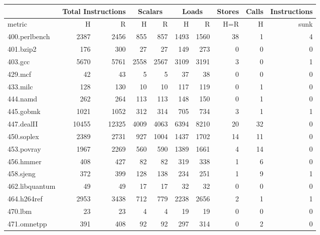 \documentclass[acmlarge,review,anonymous]{acmart}\settopmatter{printfolios=true}
\begin{document}
\begin{table}[h!]
  \begin{center}
    \begin{tabular}{|l|r|r|r|r|r|r|r|r|r|}
      \hline
 \GCM{}  &\multicolumn{2}{|c|}{Total Instructions} &\multicolumn{2}{|c|}{Scalars}  & \multicolumn{2}{|c|}{Loads} & \multicolumn{1}{|c|}{Stores} &Calls   &Instructions    \\\hline
 metric           &  H          &R        &H      &R       &H           &R              &H=R    &H & sunk \\\hline
 400.perlbench	  &  2387	& 2456	  &  855  & 857	   & 1493	& 1560		& 38	& 1	& 4	        \\\hline
 401.bzip2	  &  176	& 300	  &  27	  & 27	   & 149	& 273		& 0	& 0 	& 0		\\\hline
 403.gcc	  &  5670	& 5761	  &  2558 & 2567   & 3109	& 3191		& 3	& 0	& 1	        \\\hline
 429.mcf	  &  42	        & 43	  &  5	  & 5	   & 37 	& 38		& 0	& 0 	& 0		\\\hline
 433.milc	  &  128	& 130	  &  10	  & 10	   & 117	& 119		& 0	& 1	& 0		\\\hline
 444.namd	  &  262	& 264	  &  113  & 113	   & 148	& 150		& 0	& 1	& 0		\\\hline
 445.gobmk	  &  1021	& 1052	  &  312  & 314	   & 705	& 734		& 3	& 1	& 1	        \\\hline
 447.dealII	  &  10455	& 12325	  &  4009 & 4063   & 6394	& 8210		& 20	& 32	& 0	        \\\hline
 450.soplex	  &  2389	& 2731	  &  927  & 1004   & 1437	& 1702		& 14	& 11	& 0	        \\\hline
 453.povray	  &  1967	& 2269	  &  560  & 590	   & 1389	& 1661		& 4	& 14	& 0	        \\\hline
 456.hmmer	  &  408	& 427	  &  82	  & 82	   & 319	& 338		& 1	& 6	& 0	        \\\hline
 458.sjeng	  &  372	& 399	  &  128  & 138	   & 234	& 251		& 1	& 9	& 1	        \\\hline
 462.libquantum	  &  49	        & 49	  &  17	  & 17	   & 32	      	& 32		& 0	& 0	& 0		\\\hline
 464.h264ref	  &  2953	& 3438	  &  712  & 779	   & 2238	& 2656		& 2	& 1	& 1	        \\\hline
 470.lbm	  &  23	        & 23	  &  4	  & 4	   & 19		& 19		& 0	& 0	& 0		\\\hline
 471.omnetpp	  &  391	& 408	  &  92	  & 92	   & 297	& 314		& 0	& 2	& 0		\\\hline

\end{tabular}
\end{center}
\end{table}
\end{document}

